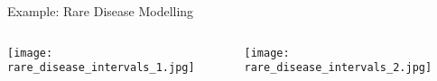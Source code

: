 \begin{frame}{Example: Rare Disease Modelling}
	\begin{columns}
		\begin{column}{0.5\textwidth}
			\centering
			\texttt{[image: rare\_disease\_intervals\_1.jpg]}
		\end{column}
		\begin{column}{0.5\textwidth}
			\centering
			\texttt{[image: rare\_disease\_intervals\_2.jpg]}
		\end{column}
	\end{columns}
\end{frame}

